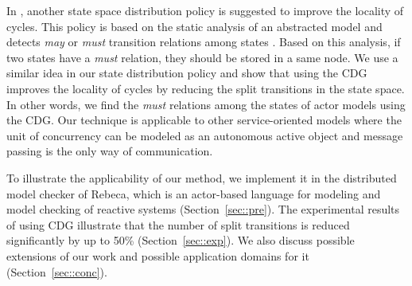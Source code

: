 In \cite{distributionPolicy}, another state space distribution policy is suggested to improve the locality of cycles.
This policy is based on the static analysis of an abstracted model and detects \emph{may} or \emph{must} transition relations among states \cite{mayMustRelation}. Based on this analysis, if two states have a \emph{must} relation, they should be stored in a same node.
We use a similar idea in our state distribution policy and show that using the CDG improves the locality of cycles by reducing the split transitions in the state space. In other words, we find the \emph{must} relations among the states of actor models using the CDG. Our technique is applicable to other service-oriented models where the unit of concurrency can be modeled as an autonomous active object and message passing is the only way of communication.

To illustrate the applicability of our method, we implement it in the distributed model checker of Rebeca, which is an actor-based language for modeling and model checking of reactive systems  (Section~\ref{sec::pre}). 
The experimental results of using CDG illustrate that the number of split transitions is reduced significantly by up to  50\% (Section~\ref{sec::exp}). We also discuss possible extensions of our work and possible application domains for it (Section~\ref{sec::conc}).